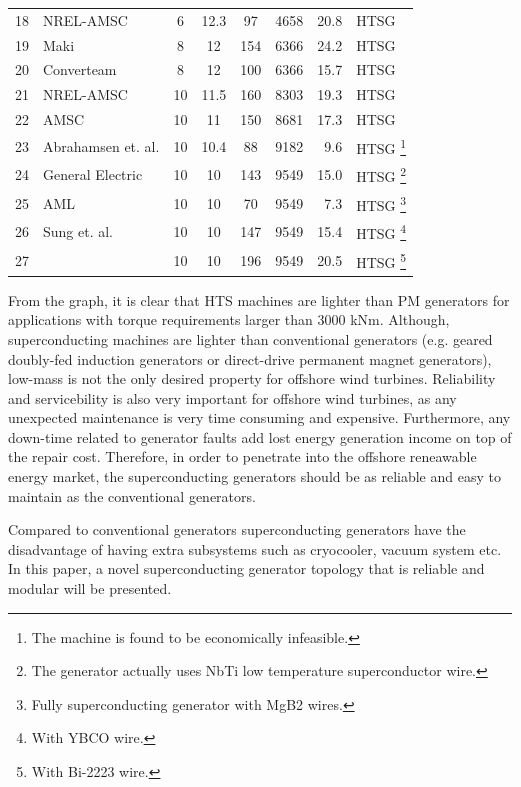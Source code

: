 \documentclass[12pt]{iopart}
\begin{document}
\begin{table}[]
\begin{minipage}{\textwidth}
\begin{tabular}{llcccrrl}
18 & NREL-AMSC \cite{Maples2010}  & 6 & 12.3 & 97 & 4658 & 20.8 & HTSG  \\
19 & Maki \cite{Maki2008}  & 8 & 12 & 154 & 6366 & 24.2 & HTSG  \\
20 & Converteam \cite{Lewis2007} & 8 & 12 & 100 & 6366 & 15.7 & HTSG  \\
21 & NREL-AMSC \cite{Maples2010} & 10 & 11.5 & 160 & 8303 & 19.3 & HTSG  \\
22 & AMSC \cite{Snitchler2010} & 10 & 11 & 150 & 8681 & 17.3 & HTSG  \\
23 & Abrahamsen et. al. \cite{Abrahamsen2010}& 10 & 10.4 & 88 & 9182 & 9.6 & HTSG \footnote{The machine is found to be economically infeasible.} \\
24 & General Electric \cite{Fair2012} & 10 & 10 & 143 & 9549 & 15.0 & HTSG \footnote{The generator actually uses NbTi low temperature superconductor wire.} \\
25 & AML \cite{Masson2011} & 10 & 10 & 70 & 9549 & 7.3 & HTSG \footnote{Fully superconducting generator with MgB2 wires.} \\
26 & Sung et. al. \cite{Sung2013} & 10 & 10 & 147 & 9549 & 15.4 & HTSG \footnote{With YBCO wire.} \\
27 & & 10 & 10 & 196 & 9549 & 20.5 & HTSG \footnote{With Bi-2223 wire.} \\
\hline
\end{tabular}
\end{minipage}
\end{table}

From the graph, it is clear that HTS machines are lighter than PM generators for applications with torque requirements larger than 3000 kNm. Although, superconducting machines are lighter than conventional generators (e.g. geared doubly-fed induction generators or direct-drive permanent magnet generators), low-mass is not the only desired property for offshore wind turbines. Reliability and servicebility is also very important for offshore wind turbines, as any unexpected maintenance is very time consuming and expensive. Furthermore, any down-time related to generator faults add lost energy generation income on top of the repair cost. Therefore, in order to penetrate into the offshore reneawable energy market, the superconducting generators should be as reliable and easy to maintain as the conventional generators. 

Compared to conventional generators superconducting generators have the disadvantage of having extra subsystems such as cryocooler, vacuum system etc. In this paper, a novel superconducting generator topology that is reliable and modular will be presented.
\end{document}

